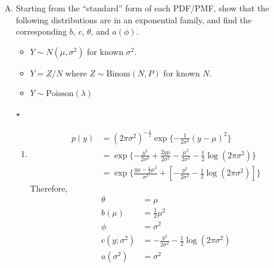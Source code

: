 \documentclass[11pt]{article}
\newcommand{\jie}{$\star$ }
\newcommand{\half}{\frac{1}{2}}
\begin{document}
\begin{enumerate}[(A)]

\item Starting from the ``standard'' form of each PDF/PMF, show that the following distributions are in an exponential family, and find the corresponding $b$, $c$, $\theta$, and $a(\phi)$.  

\begin{itemize}
\item $Y \sim N(\mu, \sigma^2)$ for known $\sigma^2$.  
\item $Y = Z/N$ where $Z \sim \mbox{Binom}(N, P)$ for known $N$.   
\item $Y \sim \mbox{Poisson}(\lambda)$  
\end{itemize}

\bigskip
\jie
\begin{enumerate}
    \item 
    \begin{align*}
    p(y) &= (2\pi\sigma^2)^{-\half} \exp \{ -\frac{1}{2\sigma^2} (y-\mu)^2 \} \\
    &= \exp \{ -\frac{y^2}{2\sigma^2} + \frac{2y\mu}{2\sigma^2} -\frac{\mu^2}{2\sigma^2} - \half \log (2\pi\sigma^2) \} \\
    &= \exp \{ \frac{y\mu -\half \mu^2}{\sigma^2} + [-\frac{y^2}{2\sigma^2} - \half \log (2\pi\sigma^2)] \}
\end{align*}
Therefore,
\begin{align*}
    \theta &= \mu \\
    b(\mu) &= \half \mu^2 \\
    \phi &= \sigma^2 \\
    c(y;\sigma^2) &= -\frac{y^2}{2\sigma^2} - \half \log (2\pi\sigma^2) \\
    a(\sigma^2) &= \sigma^2
\end{align*}
    

\end{enumerate}
\end{enumerate}
\end{document}
